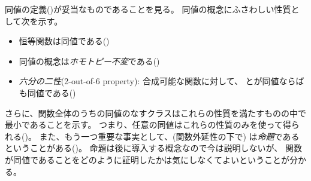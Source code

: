 \documentclass[index]{subfiles}
\begin{document}

同値の定義()が妥当なものであることを見る。
同値の概念にふさわしい性質として次を示す。
\begin{itemize}
\item 恒等関数は同値である()
\item 同値の概念は\emph{ホモトピー不変}である()
\item \emph{六分の二性}(2-out-of-6 property):
  合成可能な関数に対して、
  とが同値ならば
  も同値である()
\end{itemize}
さらに、関数全体のうちの同値のなすクラスはこれらの性質を満たすものの中で最小であることを示す。
つまり、任意の同値はこれらの性質のみを使って得られる()。
また、もう一つ重要な事実として、(関数外延性の下で)
は\emph{命題}であるということがある()。
命題は後に導入する概念なので今は説明しないが、
関数が同値であることをどのように証明したかは気にしなくてよいということが分かる。










\begin{mySubsections}
  
\end{mySubsections}
\end{document}
